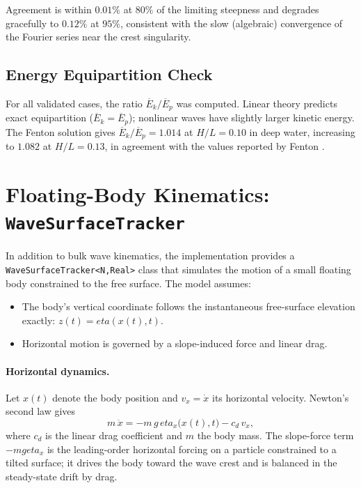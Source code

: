 \documentclass[journal,10pt,twocolumn]{IEEEtran}
\def\eta{eta}%
\newcommand{\Ebar}{\overline{E}}
\begin{document}
Agreement is within $0.01\%$ at $80\%$ of the limiting steepness
and degrades gracefully to $0.12\%$ at $95\%$, consistent with
the slow (algebraic) convergence of the Fourier series near the
crest singularity.

\subsection{Energy Equipartition Check}

For all validated cases, the ratio $\Ebar_k/\Ebar_p$ was computed.
Linear theory predicts exact equipartition ($\Ebar_k = \Ebar_p$);
nonlinear waves have slightly larger kinetic energy.
The Fenton solution gives $\Ebar_k/\Ebar_p = 1.014$ at $H/L = 0.10$
in deep water, increasing to $1.082$ at $H/L = 0.13$, in agreement
with the values reported by Fenton \cite{Fenton1988}.

\section{Floating-Body Kinematics: \texttt{WaveSurfaceTracker}}
\label{sec:wave_surface_tracker}

In addition to bulk wave kinematics, the implementation provides a
\texttt{WaveSurfaceTracker<N,Real>} class that simulates the motion of
a small floating body constrained to the free surface.
The model assumes:
\begin{itemize}[leftmargin=1.4em]
    \item The body's vertical coordinate follows the instantaneous
          free-surface elevation exactly:
          $z(t) = \eta(x(t),t)$.
    \item Horizontal motion is governed by a slope-induced force and
          linear drag.
\end{itemize}

\paragraph{Horizontal dynamics.}
Let $x(t)$ denote the body position and $v_x = \dot x$ its horizontal
velocity. Newton's second law gives
\begin{equation}
    m\,\ddot x = -m\,g\,\eta_x\bigl(x(t),t\bigr) - c_d\,v_x,
    \label{eq:tracker_motion}
\end{equation}
where $c_d$ is the linear drag coefficient and $m$ the body mass.
The slope-force term $-mg\eta_x$ is the leading-order horizontal
forcing on a particle constrained to a tilted surface; it drives the
body toward the wave crest and is balanced in the steady-state drift
by drag.
\end{document}
